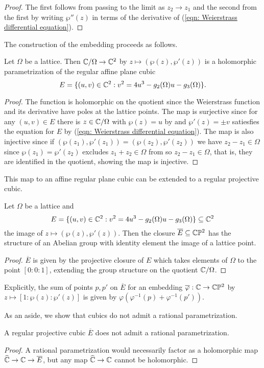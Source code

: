 \begin{proof}
    The first follows from passing to the limit as $z_{2}\to z_{1}$ and the second from the first by writing $\wp''(z)$ in terms of the derivative of (\ref{eqn: Weierstrass differential equation}). 
\end{proof}
The construction of the embedding proceeds as follows. 
\begin{proposition}\label{prop: holomorphic embedding by Weierstrass function}
    Let $\Omega$ be a lattice. Then $\mathbb{C}/\Omega\to\mathbb{C}^{2}$ by $z\mapsto(\wp(z),\wp'(z))$ is a holomorphic parametrization of the regular affine plane cubic $$E=\{(u,v)\in\mathbb{C}^{2}:v^{2}=4u^{3}-g_{2}(\Omega)u-g_{3}(\Omega)\}.$$ 
\end{proposition}
\begin{proof}
    The function is holomorphic on the quotient since the Weierstrass function and its derivative have poles at the lattice points. The map is surjective since for any $(u,v)\in E$ there is $z\in\mathbb{C}/\Omega$ with $\wp(z)=u$ by  and $\wp'(z)=\pm v$ satiesfies the equation for $E$ by (\ref{eqn: Weierstrass differential equation}). The map is also injective since if $(\wp(z_{1}),\wp'(z_{1}))=(\wp(z_{2}),\wp'(z_{2}))$ we have $z_{2}-z_{1}\in\Omega$ since $\wp(z_{1})=\wp'(z_{2})$ excludes $z_{1}+z_{2}\in\Omega$ from  so $z_{2}-z_{1}\in\Omega$, that is, they are identified in the quotient, showing the map is injective. 
\end{proof}
This map to an affine regular plane cubic can be extended to a regular projective cubic. 
\begin{proposition}\label{prop: group structure on projective cubic curve. }
    Let $\Omega$ be a lattice and
    $$E=\{(u,v)\in\mathbb{C}^{2}:v^{2}=4u^{3}-g_{2}(\Omega)u-g_{3}(\Omega)\}\subseteq\mathbb{C}^{2}$$
    the image of $z\mapsto(\wp(z),\wp'(z))$. Then the closure $\overline{E}\subseteq\mathbb{C}\mathbb{P}^{2}$ has the structure of an Abelian group with identity element the image of a lattice point. 
\end{proposition}
\begin{proof}
    $\overline{E}$ is given by the projective closure of $E$ which takes elements of $\Omega$ to the point $[0:0:1]$, extending the group structure on the quotient $\mathbb{C}/\Omega$. 
\end{proof}
\begin{remark}
    Explicitly, the sum of points $p,p'$ on $\overline{E}$ for an embedding $\overline{\varphi}:\mathbb{C}\to\mathbb{C}\mathbb{P}^{2}$ by $z\mapsto[1:\wp(z):\wp'(z)]$ is given by $\varphi(\varphi^{-1}(p)+\varphi^{-1}(p'))$. 
\end{remark}
As an aside, we show that cubics do not admit a rational parametrization. 
\begin{proposition}\label{prop: no rational parametrization for cubics}
    A regular projective cubic $\overline{E}$ does not admit a rational parametrization. 
\end{proposition}
\begin{proof}
    A rational parametrization would necessarily factor as a holomorphic map $\widehat{\mathbb{C}}\to\mathbb{C}\to\overline{E}$, but any map $\widehat{\mathbb{C}}\to\mathbb{C}$ cannot be holomorphic. 
\end{proof}